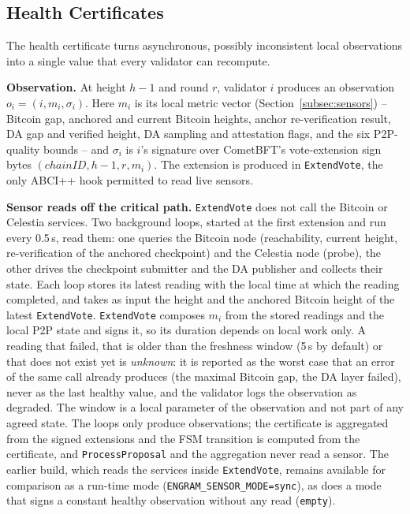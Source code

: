 \subsection{Health Certificates}
\label{subsec:health-certificate}

The health certificate turns asynchronous, possibly inconsistent local
observations into a single value that every validator can recompute.

\textbf{Observation.} At height $h{-}1$ and round $r$, validator $i$ produces
an observation $o_i = (i, m_i, \sigma_i)$. Here $m_i$ is its local metric
vector (Section~\ref{subsec:sensors}) -- Bitcoin gap, anchored and current Bitcoin heights, anchor
re-verification result, DA gap and verified height, DA sampling and
attestation flags, and the six P2P-quality bounds -- and $\sigma_i$ is $i$'s
signature over CometBFT's vote-extension sign bytes
$(\mathit{chainID}, h{-}1, r, m_i)$. The extension is produced in
\texttt{ExtendVote}, the only ABCI++ hook permitted to read live sensors.

\textbf{Sensor reads off the critical path.} \texttt{ExtendVote} does not call the Bitcoin or Celestia services. Two background loops, started at the first extension and run every 0.5\,s, read them: one queries the Bitcoin node (reachability, current height, re-verification of the anchored checkpoint) and the Celestia node (probe), the other drives the checkpoint submitter and the DA publisher and collects their state. Each loop stores its latest reading with the local time at which the reading completed, and takes as input the height and the anchored Bitcoin height of the latest \texttt{ExtendVote}. \texttt{ExtendVote} composes $m_i$ from the stored readings and the local P2P state and signs it, so its duration depends on local work only. A reading that failed, that is older than the freshness window (5\,s by default) or that does not exist yet is \emph{unknown}: it is reported as the worst case that an error of the same call already produces (the maximal Bitcoin gap, the DA layer failed), never as the last healthy value, and the validator logs the observation as degraded. The window is a local parameter of the observation and not part of any agreed state. The loops only produce observations; the certificate is aggregated from the signed extensions and the FSM transition is computed from the certificate, and \texttt{ProcessProposal} and the aggregation never read a sensor. The earlier build, which reads the services inside \texttt{ExtendVote}, remains available for comparison as a run-time mode (\texttt{ENGRAM\_SENSOR\_MODE=sync}), as does a mode that signs a constant healthy observation without any read (\texttt{empty}).

